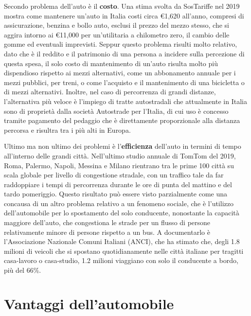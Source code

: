 Secondo problema dell'auto è il \textbf{costo}. Una stima svolta da SosTariffe nel 2019 mostra come mantenere un'auto in Italia costi circa €1,620 all'anno, compresi di assicurazione, benzina e bollo auto, esclusi il prezzo del mezzo stesso, che si aggira intorno ai €11,000 per un'utilitaria a chilometro zero, il cambio delle gomme ed eventuali imprevisti\cite{sostariffe}. Seppur questo problema risulti molto relativo, dato che è il reddito e il patrimonio di una persona a incidere sulla percezione di questa spesa, il solo costo di mantenimento di un'auto risulta molto più dispendioso rispetto ai mezzi alternativi, come un abbonamento annuale per i mezzi pubblici, per treni, o come l'acquisto e il mantenimento di una bicicletta o di mezzi alternativi. Inoltre, nel caso di percorrenza di grandi distanze, l'alternativa più veloce è l'impiego di tratte autostradali che attualmente in Italia sono di proprietà dalla società Autostrade per l'Italia, di cui uso è concesso tramite pagamento del pedaggio che è direttamente proporzionale alla distanza percorsa e risultra tra i più alti in Europa.

Ultimo ma non ultimo dei problemi è l'\textbf{efficienza} dell'auto in termini di tempo all'interno delle grandi città. Nell'ultimo studio annuale di TomTom del 2019\cite{tomtomindexmilan}, Roma, Palermo, Napoli, Messina e Milano rientrano tra le prime 100 città su scala globale per livello di congestione stradale, con un traffico tale da far raddoppiare i tempi di percorrenza durante le ore di punta del mattino e del tardo pomeriggio. Questo risultato può essere visto parzialmente come una concausa di un altro problema relativo a un fenomeno sociale, che è l'utilizzo dell'automobile per lo spostamento del solo conducente, nonostante la capacità maggiore dell'auto, che congestiona le strade per un flusso di persone relativamente minore di persone rispetto a un bus. A documentarlo è l'Associazione Nazionale Comuni Italiani (ANCI), che ha stimato che, degli 1.8 milioni di veicoli che si spostano quotidianamente nelle città italiane per tragitti casa-lavoro o casa-studio, 1.2 milioni viaggiano con solo il conducente a bordo\cite{anciperrepubblica}, più del 66\%.

\section{Vantaggi dell'automobile}

